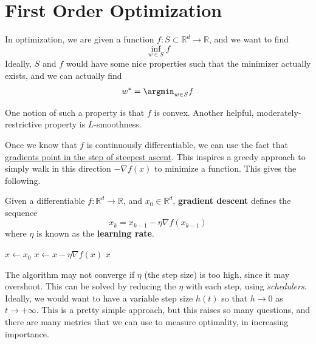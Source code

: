 \section{First Order Optimization} 

	In optimization, we are given a function $f: S \subset \mathbb{R}^d \to \mathbb{R}$, and we want to find 
	\begin{equation}
		\inf_{w \in S} f
	\end{equation}
	Ideally, $S$ and $f$ would have some nice properties such that the minimizer actually exists, and we can actually find 
	\begin{equation}
		w^\ast = \argmin_{w \in S} f
	\end{equation}

	One notion of such a property is that $f$ is convex. Another helpful, moderately-restrictive property is $L$-smoothness. 

	Once we know that $f$ is continuously differentiable, we can use the fact that \hyperref[mul-thm:gradient_increase]{gradients point in the step of steepest ascent}. This inspires a greedy approach to simply walk in this direction $-\nabla f(x)$ to minimize a function. This gives the following. 

  \begin{definition}
    \label{def:gradient-descent}
		Given a differentiable $f: \mathbb{R}^d \to \mathbb{R}$, and $x_0 \in \mathbb{R}^d$, \textbf{gradient descent} defines the sequence 
		\begin{equation}
			x_{k} = x_{k - 1} - \eta \nabla f(x_{k-1})
		\end{equation}
		where $\eta$ is known as the \textbf{learning rate}. 

    \begin{algorithm}[H]
			\begin{algorithmic}[1]  %
					\State $x \gets x_0$ 
						\State $x \gets x - \eta \nabla f(x)$
					\EndWhile
					\State \Return $x$ 
				\EndProcedure
			\end{algorithmic}
    \end{algorithm} 
  \end{definition}

  The algorithm may not converge if $\eta$ (the step size) is too high, since it may overshoot. This can be solved by reducing the $\eta$ with each step, using \textit{schedulers}. Ideally, we would want to have a variable step size $h(t)$ so that $h \rightarrow 0$ as $t \rightarrow + \infty$. This is a pretty simple approach, but this raises so many questions, and there are many metrics that we can use to measure optimality, in increasing importance. 

